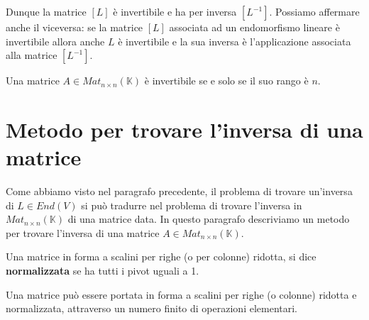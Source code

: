 Dunque la matrice $[L]$ \`e invertibile e ha per inversa $[L^{-1}]$.
Possiamo affermare anche il viceversa: se la matrice $[L]$ associata ad un
endomorfismo lineare \`e invertibile allora anche $L$ \`e invertibile e la sua
inversa \`e l'applicazione associata alla matrice $[L^{-1}]$.

\begin{corollary}
	Una matrice $A \in Mat_{n \times n}(\mathbb{K})$ \`e invertibile se e solo se
	il suo rango \`e $n$.
\end{corollary}

\section{Metodo per trovare l'inversa di una matrice}
Come abbiamo visto nel paragrafo precedente, il problema di trovare un'inversa
di $L \in End(V)$ si pu\`o tradurre nel problema di trovare l'inversa in
$Mat_{n \times n}(\mathbb{K})$ di una matrice data. In questo paragrafo descriviamo
un metodo per trovare l'inversa di una matrice $A \in Mat_{n \times n}(\mathbb{K})$.

\begin{definition}
	Una matrice in forma a scalini per righe (o per colonne) ridotta, si dice
	\textbf{normalizzata} se ha tutti i pivot uguali a 1.
\end{definition}

\begin{observation}
	Una matrice pu\`o essere portata in forma a scalini per righe (o colonne)
	ridotta e normalizzata, attraverso un numero finito di operazioni elementari.
\end{observation}


